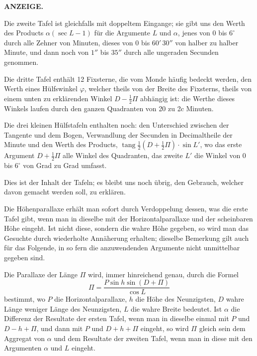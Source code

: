 \clearpage
\thispagestyle{empty}
\noindent{}%
%
\parbox[t]{\dimexpr\linewidth-24mm\relax}{\centering\footnotesize\bfseries ANZEIGE.\par}%
\makebox[12mm][r]{}\par\medskip
Die zweite Tafel ist gleichfalls mit doppeltem Eingange; sie gibt uns den Werth des Products
$\alpha(\sec L - 1)$ für die Argumente $L$ und $\alpha$, jenes von 0 bis $6^{\circ}$ durch alle Zehner von Minuten, dieses von
0 bis $60'\,30''$ von halber zu halber Minute, und dann noch von $1''$ bis $35''$ durch alle ungeraden Secunden
genommen.

Die dritte Tafel enthält 12 Fixsterne, die vom Monde häufig bedeckt werden, den Werth eines
Hülfswinkel $\varphi$, welcher theils von der Breite des Fixsterns, theils von einem unten zu erklärenden
Winkel $D - \tfrac{1}{2}\Pi$ abhängig ist: die Werthe dieses Winkels laufen durch den ganzen Quadranten von
20 zu 2c Minuten.

Die drei kleinen Hülfstafeln enthalten noch: den Unterschied zwischen der Tangente und dem
Bogen, Verwandlung der Secunden in Decimaltheile der Minute und den Werth des Products,
$\operatorname{tang} \tfrac{1}{2}(D+\tfrac{1}{2}\Pi)\cdot\sin L'$, wo das erste Argument $D+\tfrac{1}{2}\Pi$ alle Winkel des Quadranten, das zweite $L'$
die Winkel von 0 bis $6^{\circ}$ von Grad zu Grad umfasst.

Dies ist der Inhalt der Tafeln; es bleibt uns noch übrig, den Gebrauch, welcher davon gemacht
werden soll, zu erklären.

Die Höhenparallaxe erhält man sofort durch Verdoppelung dessen, was die erste Tafel gibt, wenn
man in dieselbe mit der Horizontalparallaxe und der scheinbaren Höhe eingeht. Ist nicht diese, sondern die wahre Höhe gegeben, so wird man das Gesuchte durch wiederholte Annäherung erhalten; dieselbe Bemerkung gilt auch für das Folgende, in so fern die anzuwendenden Argumente nicht unmittelbar gegeben sind.

Die Parallaxe der Länge $\Pi$ wird, immer hinreichend genau, durch die Formel
\[
\Pi = \dfrac{P \sin h \sin(D+\Pi)}{\cos L}
\]
bestimmt, wo $P$ die Horizontalparallaxe, $h$ die Höhe des Neunzigsten, $D$ wahre Länge weniger Länge
des Neunzigsten, $L$ die wahre Breite bedeutet. Ist $\alpha$ die Differenz der Resultate der ersten Tafel, wenn
man in dieselbe einmal mit $P$ und $D-h+\Pi$, und dann mit $P$ und $D+h+\Pi$ eingeht, so wird $\Pi$
gleich sein dem Aggregat von $\alpha$ und dem Resultate der zweiten Tafel, wenn man in diese mit den Argumenten $\alpha$ und $L$ eingeht.

